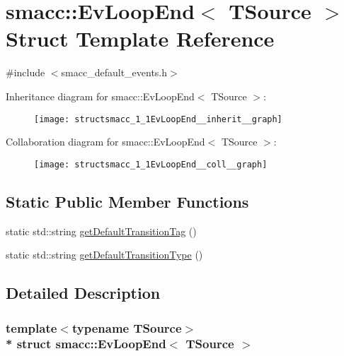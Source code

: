 \hypertarget{structsmacc_1_1EvLoopEnd}{}\section{smacc\+:\+:Ev\+Loop\+End$<$ T\+Source $>$ Struct Template Reference}
\label{structsmacc_1_1EvLoopEnd}


{\ttfamily \#include $<$smacc\+\_\+default\+\_\+events.\+h$>$}



Inheritance diagram for smacc\+:\+:Ev\+Loop\+End$<$ T\+Source $>$\+:
\nopagebreak
\begin{figure}[H]
\begin{center}
\leavevmode
\texttt{[image: structsmacc\_1\_1EvLoopEnd\_\_inherit\_\_graph]}
\end{center}
\end{figure}


Collaboration diagram for smacc\+:\+:Ev\+Loop\+End$<$ T\+Source $>$\+:
\nopagebreak
\begin{figure}[H]
\begin{center}
\leavevmode
\texttt{[image: structsmacc\_1\_1EvLoopEnd\_\_coll\_\_graph]}
\end{center}
\end{figure}
\subsection*{Static Public Member Functions}
\begin{DoxyCompactItemize}
\item 
static std\+::string \hyperlink{structsmacc_1_1EvLoopEnd_accdbdf601fb379dab65df9fa2f6da655}{get\+Default\+Transition\+Tag} ()
\item 
static std\+::string \hyperlink{structsmacc_1_1EvLoopEnd_a6c3a28ee1faa75c667c2dc7b65937ca9}{get\+Default\+Transition\+Type} ()
\end{DoxyCompactItemize}


\subsection{Detailed Description}
\subsubsection*{template$<$typename T\+Source$>$\\*
struct smacc\+::\+Ev\+Loop\+End$<$ T\+Source $>$}



